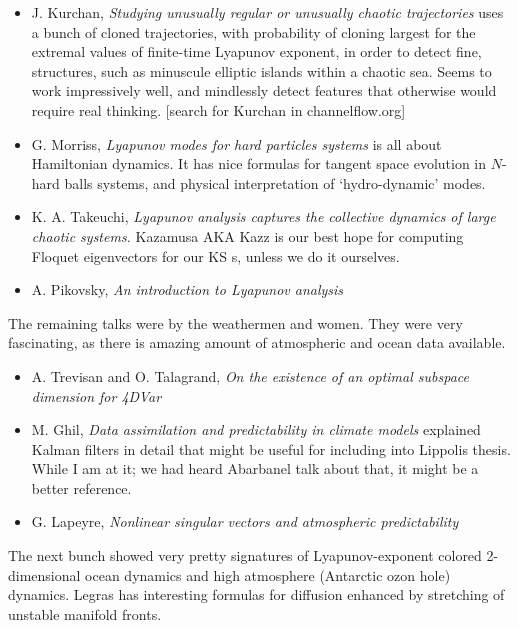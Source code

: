 \begin{itemize}
\begin{description}
\end{description}
  \item J. Kurchan, {\em Studying unusually regular or
      unusually chaotic trajectories } uses a bunch of
      cloned trajectories, with probability of cloning
      largest for the extremal values of finite-time
      Lyapunov exponent, in order to detect fine,
      structures, such as minuscule elliptic islands
      within a chaotic sea. Seems to work impressively
      well, and mindlessly detect features that
      otherwise would require real thinking.
      	[search for Kurchan in channelflow.org]
  \item G. Morriss, {\em Lyapunov modes for hard
      particles systems} is all about Hamiltonian
      dynamics. It has nice formulas for tangent space
      evolution in $N$-hard balls systems, and physical
      interpretation of `hydro-dynamic' modes.
  \item K. A. Takeuchi, {\em Lyapunov analysis captures
      the collective dynamics of large chaotic
      systems.} Kazamusa AKA Kazz is our best hope for
      computing Floquet eigenvectors for our KS \rpo s,
      unless we do it ourselves.

  \item A. Pikovsky, {\em An introduction to Lyapunov
      analysis
        }
  \end{itemize}
The remaining talks were by the weathermen and women. They were
very fascinating, as there is amazing amount of atmospheric and
ocean data available.
  \begin{itemize}
  \item A. Trevisan and O. Talagrand, {\em On the
      existence of an optimal subspace dimension for
        4DVar }
  \item M. Ghil, {\em Data assimilation and predictability
      in climate models} explained Kalman filters in detail
      that might be useful for including into Lippolis
      thesis. While I am at it; we had heard
      Abarbanel talk about that, it might be a
      better reference.
  \item G. Lapeyre, {\em Nonlinear singular vectors and
      atmospheric predictability }
  \end{itemize}
The next bunch showed very pretty signatures of
Lyapunov-exponent colored 2-dimensional ocean dynamics and
high atmosphere (Antarctic ozon hole) dynamics. Legras has
interesting formulas for diffusion enhanced by stretching
of unstable manifold fronts.

